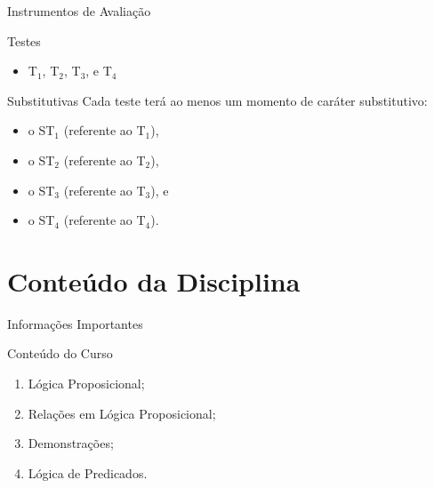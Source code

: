 \documentclass[xcolor=dvipsnames,table]{beamer}
\begin{document}
\begin{frame}{Instrumentos de Avaliação}

    \begin{block}{Testes}
        \begin{itemize}
            \item T$_1$, T$_2$, T$_3$, e T$_4$
        \end{itemize}
    \end{block} \pause

    \begin{block}{Substitutivas}
		Cada teste terá ao menos um momento de caráter substitutivo: \pause 
		\begin{itemize}
			\item o ST$_1$ (referente ao T$_1$), 
			\item o ST$_2$ (referente ao T$_2$),
            \item o ST$_3$ (referente ao T$_3$), e 
			\item o ST$_4$ (referente ao T$_4$).
		\end{itemize} \pause
		
		\begin{itemize}
			
		\end{itemize}
	\end{block}
	
\end{frame}

\section{Conteúdo da Disciplina}
	
	\begin{frame}{Informações Importantes}
		\begin{block}{Conteúdo do Curso}
			\begin{enumerate}
				\item Lógica Proposicional;
				\item Relações em Lógica Proposicional;
				\item Demonstrações;
				\item Lógica de Predicados.
			\end{enumerate}
		\end{block}
	\end{frame}
\end{document}
